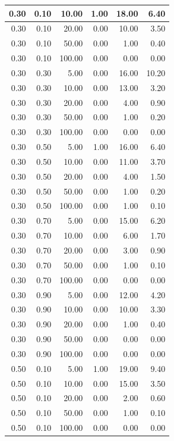 \documentclass{bmstu}
\begin{document}
\begin{longtable}{|r|r|r|r|r|r|}
0.30 & 0.10 & 10.00 & 1.00 & 18.00 & 6.40 \\ \hline
0.30 & 0.10 & 20.00 & 0.00 & 10.00 & 3.50 \\ \hline
0.30 & 0.10 & 50.00 & 0.00 & 1.00 & 0.40 \\ \hline
0.30 & 0.10 & 100.00 & 0.00 & 0.00 & 0.00 \\ \hline
0.30 & 0.30 & 5.00 & 0.00 & 16.00 & 10.20 \\ \hline
0.30 & 0.30 & 10.00 & 0.00 & 13.00 & 3.20 \\ \hline
0.30 & 0.30 & 20.00 & 0.00 & 4.00 & 0.90 \\ \hline
0.30 & 0.30 & 50.00 & 0.00 & 1.00 & 0.20 \\ \hline
0.30 & 0.30 & 100.00 & 0.00 & 0.00 & 0.00 \\ \hline
0.30 & 0.50 & 5.00 & 1.00 & 16.00 & 6.40 \\ \hline
0.30 & 0.50 & 10.00 & 0.00 & 11.00 & 3.70 \\ \hline
0.30 & 0.50 & 20.00 & 0.00 & 4.00 & 1.50 \\ \hline
0.30 & 0.50 & 50.00 & 0.00 & 1.00 & 0.20 \\ \hline
0.30 & 0.50 & 100.00 & 0.00 & 1.00 & 0.10 \\ \hline
0.30 & 0.70 & 5.00 & 0.00 & 15.00 & 6.20 \\ \hline
0.30 & 0.70 & 10.00 & 0.00 & 6.00 & 1.70 \\ \hline
0.30 & 0.70 & 20.00 & 0.00 & 3.00 & 0.90 \\ \hline
0.30 & 0.70 & 50.00 & 0.00 & 1.00 & 0.10 \\ \hline
0.30 & 0.70 & 100.00 & 0.00 & 0.00 & 0.00 \\ \hline
0.30 & 0.90 & 5.00 & 0.00 & 12.00 & 4.20 \\ \hline
0.30 & 0.90 & 10.00 & 0.00 & 10.00 & 3.30 \\ \hline
0.30 & 0.90 & 20.00 & 0.00 & 1.00 & 0.40 \\ \hline
0.30 & 0.90 & 50.00 & 0.00 & 0.00 & 0.00 \\ \hline
0.30 & 0.90 & 100.00 & 0.00 & 0.00 & 0.00 \\ \hline
0.50 & 0.10 & 5.00 & 1.00 & 19.00 & 9.40 \\ \hline
0.50 & 0.10 & 10.00 & 0.00 & 15.00 & 3.50 \\ \hline
0.50 & 0.10 & 20.00 & 0.00 & 2.00 & 0.60 \\ \hline
0.50 & 0.10 & 50.00 & 0.00 & 1.00 & 0.10 \\ \hline
0.50 & 0.10 & 100.00 & 0.00 & 0.00 & 0.00 \\ \hline

\end{longtable}
\end{document}

